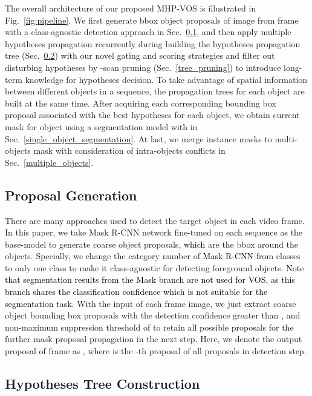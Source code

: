\documentclass[10pt,twocolumn,letterpaper]{article}
\newcommand{\ldz}[1]{\textcolor{black}{#1}}
\begin{document}
The overall architecture of our proposed MHP-VOS is illustrated in Fig.~\ref{fig:pipeline}. We first generate bbox object proposals  of image  from frame  with a class-agnostic detection approach in Sec.~\ref{proposal_generation}, and then apply multiple hypotheses propagation recurrently during building the hypotheses propagation tree (Sec.~\ref{proposal_tree}) with our novel gating and scoring strategies and filter out disturbing hypotheses by -scan pruning (Sec.~\ref{tree_pruning}) to introduce long-term knowledge for hypotheses decision. To take advantage of spatial information between different objects in a sequence, the propagation trees for each object are built at the same time. After acquiring each corresponding bounding box proposal  associated with the best hypotheses for each object, we obtain current mask  for object  using a segmentation model with  in Sec.~\ref{single_object_segmentation}. At last, we merge instance masks  to multi-objects mask  with consideration of intra-objects conflicts in Sec.~\ref{multiple_objects}.




\subsection{Proposal Generation}
\label{proposal_generation}
\vspace{-5pt}

There are many approaches \cite{ren2017faster, he2017mask} used to detect the target object in each video frame. In this paper, we take Mask R-CNN \cite{he2017mask} network fine-tuned on each sequence
as the base-model to generate coarse object proposals, \ldz{which} are the bbox around the objects. Specially, we change the category number of \ldz{Mask R-CNN} from  classes to only one class to make it class-agnostic for detecting foreground objects. 
\ldz{Note that segmentation results from the Mask branch are not used for VOS, as this branch shares the classification confidence which is not suitable for the segmentation task.}
With the input of each frame image,  we just extract coarse object bounding box proposals with the detection confidence greater than , and non-maximum suppression threshold of  to retain all possible proposals for the further mask proposal propagation in the next step. Here, we denote the output proposal of frame  as , where  is the -th proposal of all  proposals \ldz{in detection step}.

\subsection{Hypotheses Tree Construction}
\label{proposal_tree}
\vspace{-5pt}
\end{document}
